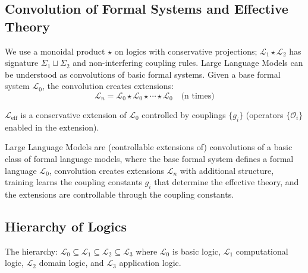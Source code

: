 \subsection{Convolution of Formal Systems and Effective Theory}

\begin{definition}
\label{def:convolution-formal}
We use a monoidal product $\star$ on logics with conservative projections; $\mathcal{L}_1\star\mathcal{L}_2$ has signature $\Sigma_1\sqcup\Sigma_2$ and non-interfering coupling rules. Large Language Models can be understood as convolutions of basic formal systems. Given a base formal system $\mathcal{L}_0$, the convolution creates extensions:
\[
\mathcal{L}_n = \mathcal{L}_0 \star \mathcal{L}_0 \star \cdots \star \mathcal{L}_0 \quad \text{(n times)}
\]
\end{definition}

\begin{definition}
\label{def:effective-computation}
$\mathcal{L}_{\text{eff}}$ is a conservative extension of $\mathcal{L}_0$ controlled by couplings $\{g_i\}$ (operators $\{\mathcal{O}_i\}$ enabled in the extension).
\end{definition}

\begin{theorem}
\label{thm:llm-formal}
Large Language Models are (controllable extensions of) convolutions of a basic class of formal language models, where the base formal system defines a formal language $\mathcal{L}_0$, convolution creates extensions $\mathcal{L}_n$ with additional structure, training learns the coupling constants $g_i$ that determine the effective theory, and the extensions are controllable through the coupling constants.
\end{theorem}

\subsection{Hierarchy of Logics}

\begin{definition}
\label{def:hierarchy-logics}
The hierarchy: $\mathcal{L}_0 \subseteq \mathcal{L}_1 \subseteq \mathcal{L}_2 \subseteq \mathcal{L}_3$ where $\mathcal{L}_0$ is basic logic, $\mathcal{L}_1$ computational logic, $\mathcal{L}_2$ domain logic, and $\mathcal{L}_3$ application logic.
\end{definition}

